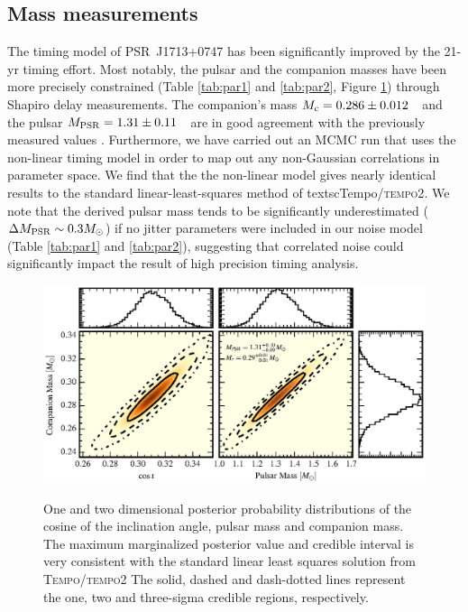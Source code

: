 \subsection{Mass measurements}
\label{sec:mass}
The timing model of PSR~J1713+0747 has been significantly improved by the 21-yr timing effort.
Most notably, the pulsar and the companion masses have been more precisely
constrained (Table \ref{tab:par1} and \ref{tab:par2}, Figure \ref{fig:masses}) through Shapiro delay measurements. The
companion's mass $M_{\rm c} = 0.286\pm0.012$~\Msun\, and the pulsar $M_{\rm
PSR}=1.31\pm0.11$~\Msun\, are in good agreement with the previously measured
values \citep{sns+05}. Furthermore, we have carried out an MCMC run that uses the non-linear timing
model in order to map out any non-Gaussian correlations in parameter space. We find that the the non-linear
model gives nearly identical results to the standard linear-least-squares method of textsc{Tempo}/\textsc{tempo2}.
We note that the derived pulsar mass tends to be significantly underestimated
($\Delta M_{\rm PSR} \sim 0.3 M_{\odot}$) if no jitter parameters were included in our noise model (Table
\ref{tab:par1} and \ref{tab:par2}), suggesting that
correlated noise could significantly impact the result of high
precision timing analysis.

\begin{figure}[!ht]
\includegraphics[scale=1]{1713_masses_color.eps} \\ 
\caption {\label{fig:masses}  One and two dimensional posterior probability distributions of the cosine of the inclination
angle, pulsar mass and companion mass. The maximum marginalized posterior value and credible interval is very consistent with the standard linear least squares solution from \textsc{Tempo}/\textsc{tempo2} The solid, dashed and dash-dotted lines represent the one, two and three-sigma credible regions, respectively.
} 
\end{figure} 


